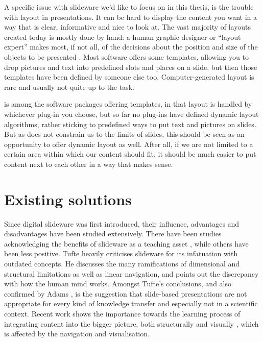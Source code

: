    A specific issue with slideware we'd like to focus on in this thesis, is the
   trouble with layout in presentations. It can be hard to display the content
   you want in a way that is clear, informative and nice to look at. The vast
   majority of layouts created today is mostly done by hand: a human graphic
   designer or ``layout expert'' makes most, if not all, of the decisions about
   the position and size of the objects to be presented \citep{lok-1}. Most
   software offers some templates, allowing you to drop pictures and text into
   predefined slots and places on a slide, but then those templates have been
   defined by someone else too. Computer-generated layout is rare and usually
   not quite up to the task.

   \mxp is among the software packages offering templates, in that layout is
   handled by whichever plug-in you choose, but so far no plug-ins have defined
   dynamic layout algorithms, rather sticking to predefined ways to put text
   and pictures on slides. But as \mxp does not constrain us to the limits of
   slides, this should be seen as an opportunity to offer dynamic layout as
   well. After all, if we are not limited to a certain area within which our
   content should fit, it should be much easier to put content next to each
   other in a way that makes sense.

  \section{Existing solutions}

   Since digital slideware was first introduced, their influence, advantages
   and disadvantages have been studied extensively. There have been studies
   acknowledging the benefits of slideware as a teaching asset
   \citep{holzinger-1}, while others have been less positive. Tufte
   \citeyearpar{tufte-1} heavily criticises slideware for its infatuation with
   outdated concepts. He discusses the many ramifications of dimensional and
   structural limitations as well as linear navigation, and points out the
   discrepancy with how the human mind works. Amongst Tufte's conclusions, and
   also confirmed by Adams \citep{adams-1}, is the suggestion that slide-based
   presentations are not appropriate for every kind of knowledge transfer and
   especially not in a scientific context. Recent work shows the importance
   towards the learning process of integrating content into the bigger picture,
   both structurally and visually \citep{gross-1}, which is affected by the
   navigation and visualisation.

